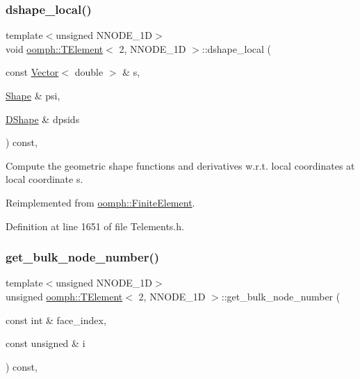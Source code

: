 \subsubsection{\texorpdfstring{dshape\+\_\+local()}{dshape\_local()}}
{\footnotesize\ttfamily template$<$unsigned N\+N\+O\+D\+E\+\_\+1D$>$ \\
void \hyperlink{classoomph_1_1TElement}{oomph\+::\+T\+Element}$<$ 2, N\+N\+O\+D\+E\+\_\+1D $>$\+::dshape\+\_\+local (\begin{DoxyParamCaption}\item[{const \hyperlink{classoomph_1_1Vector}{Vector}$<$ double $>$ \&}]{s,  }\item[{\hyperlink{classoomph_1_1Shape}{Shape} \&}]{psi,  }\item[{\hyperlink{classoomph_1_1DShape}{D\+Shape} \&}]{dpsids }\end{DoxyParamCaption}) const\hspace{0.3cm}{\ttfamily [inline]}, {\ttfamily [virtual]}}



Compute the geometric shape functions and derivatives w.\+r.\+t. local coordinates at local coordinate s. 



Reimplemented from \hyperlink{classoomph_1_1FiniteElement_a9db1456b827131c21a991ac9fedf4b0c}{oomph\+::\+Finite\+Element}.



Definition at line 1651 of file Telements.\+h.

\mbox{\label{classoomph_1_1TElement_3_012_00_01NNODE__1D_01_4_ae420264d2e271e3aba2403d61f713c54}} 
\subsubsection{\texorpdfstring{get\+\_\+bulk\+\_\+node\+\_\+number()}{get\_bulk\_node\_number()}}
{\footnotesize\ttfamily template$<$unsigned N\+N\+O\+D\+E\+\_\+1D$>$ \\
unsigned \hyperlink{classoomph_1_1TElement}{oomph\+::\+T\+Element}$<$ 2, N\+N\+O\+D\+E\+\_\+1D $>$\+::get\+\_\+bulk\+\_\+node\+\_\+number (\begin{DoxyParamCaption}\item[{const int \&}]{face\+\_\+index,  }\item[{const unsigned \&}]{i }\end{DoxyParamCaption}) const\hspace{0.3cm}{\ttfamily [inline]}, {\ttfamily [virtual]}}



